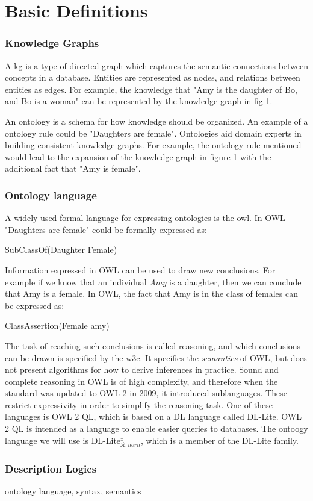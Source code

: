 \chapter{Basic Definitions}


\subsection{Knowledge Graphs}
A \gls{kg} is a type of directed graph which captures the semantic connections between concepts in a database. Entities are represented as nodes, and relations between entities as edges. For example, the knowledge that "Amy is the daughter of Bo, and Bo is a woman" can be represented by the knowledge graph in fig 1.


An ontology is a schema for how knowledge should be organized. An example of a ontology rule could be "Daughters are female". Ontologies aid domain experts in building consistent knowledge graphs. For example, the ontology rule mentioned would lead to the expansion of the knowledge graph in figure 1 with the additional fact that "Amy is female".

\subsection{Ontology language}
A widely used formal language for expressing ontologies is the \gls{owl}. In OWL "Daughters are female" could be formally expressed as:

\centerline{\textsf{SubClassOf(Daughter Female)}}
Information expressed in OWL can be used to draw new conclusions. For example if we know that an individual \emph{Amy} is a daughter, then we can conclude that Amy is a female. In OWL, the fact that Amy is in the class of females can be expressed as:

\centerline{\textsf{ClassAssertion(Female amy)}}
The task of reaching such conclusions is called reasoning, and which conclusions can be drawn is specified by the \gls{w3c}. It specifies the \emph{semantics} of OWL, but does not present algorithms for how to derive inferences in practice. Sound and complete reasoning in OWL is of high complexity, and therefore when the standard was updated to OWL 2 in 2009, it introduced sublanguages. These restrict expressivity in order to simplify the reasoning task. One of these languages is OWL 2 QL, which is based on a \gls{DL} language called DL-Lite. OWL 2 QL is intended as a language to enable easier queries to databases. The ontoogy language we will use is DL-Lite$_{\mathcal{R}, horn}^{\exists}$, which is a member of the DL-Lite family.

\subsection{Description Logics}

ontology language, syntax, semantics
